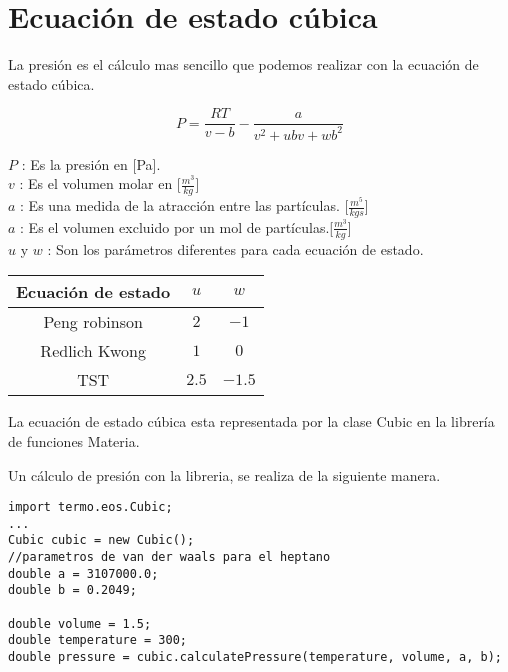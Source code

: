 \section{Ecuación de estado cúbica}
 La presión es el cálculo mas sencillo que podemos realizar con la ecuación de estado cúbica.

\begin{equation}
	P = \frac{R T}{v-b} - \frac{a}{v^2 +u b v + w b^2 }
\end{equation}

{$P$} : Es la presión en [Pa].\\
{$v$} : Es el volumen molar en [$\frac{m^3}{kg}$]\\
{$a$} : Es una medida de la atracción entre las partículas. [$\frac{m^5}{kg s}$]\\
{$a$} : Es el volumen excluido por un mol de partículas.[$\frac{m^3}{kg}$]\\
{$u $ y $w $} : Son los parámetros diferentes para cada ecuación de estado.\\

\begin{tabular}{|c |c |c|}
	\hline
	Ecuación de estado  & $u$ & $w$ \\
	\hline
	Peng robinson  & $2$& $-1$\\
	\hline
	Redlich Kwong  & $1$& $0$\\
	\hline
	TST  & $2.5$& $-1.5$\\
	\hline
\end{tabular}

La ecuación de estado cúbica esta representada por la clase Cubic en la librería de funciones Materia.

Un cálculo de presión con la libreria, se realiza de la siguiente manera.
\begin{lstlisting}[label=pressureCalculation,caption=Cálculo de presión para el heptano con la ecuación de estado cúbica de Van Der Waals]
import termo.eos.Cubic;
...
Cubic cubic = new Cubic();
//parametros de van der waals para el heptano
double a = 3107000.0;
double b = 0.2049;

double volume = 1.5;
double temperature = 300;
double pressure = cubic.calculatePressure(temperature, volume, a, b);
\end{lstlisting}

